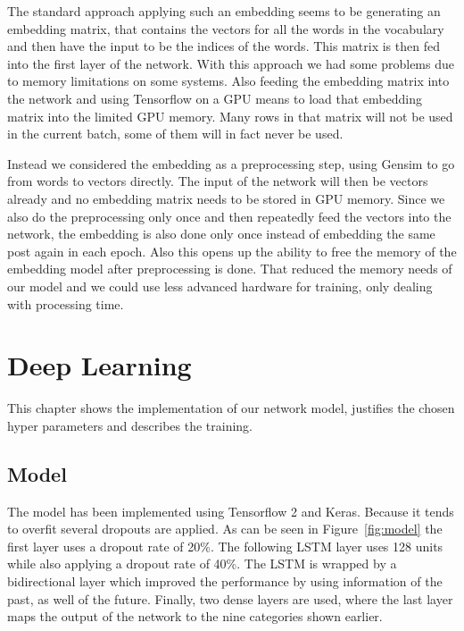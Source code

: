 \documentclass[11pt,a4paper]{article}
\begin{document}
The standard approach applying such an embedding seems to be generating an embedding matrix, that contains the vectors for all the words in the vocabulary and then have the input to be the indices of the words. 
This matrix is then fed into the first layer of the network. With this approach we had some problems due to memory limitations on some systems. 
Also feeding the embedding matrix into the network and using Tensorflow on a GPU means to load that embedding matrix into the limited GPU memory. 
Many rows in that matrix will not be used in the current batch, some of them will in fact never be used.

Instead we considered the embedding as a preprocessing step, using Gensim to go from words to vectors directly.
The input of the network will then be vectors already and no embedding matrix needs to be stored in GPU memory.
Since we also do the preprocessing only once and then repeatedly feed the vectors into the network, the embedding is also done only once instead of embedding the same post again in each epoch.
Also this opens up the ability to free the memory of the embedding model after preprocessing is done.
That reduced the memory needs of our model and we could use less advanced hardware for training, only dealing with processing time.


\section{Deep Learning}

This chapter shows the implementation of our network model, justifies the chosen hyper parameters and describes the training.


\subsection{Model}
The model has been implemented using Tensorflow 2 and Keras. Because it tends to overfit several dropouts are applied. As can be seen in Figure~\ref{fig:model} the first layer uses a dropout rate of 20\%. The following LSTM layer uses 128 units while also applying a dropout rate of 40\%. The LSTM is wrapped by a bidirectional layer which improved the performance by using information of the past, as well of the future. Finally, two dense layers are used, where the last layer maps the output of the network to the nine categories shown earlier.
\end{document}
